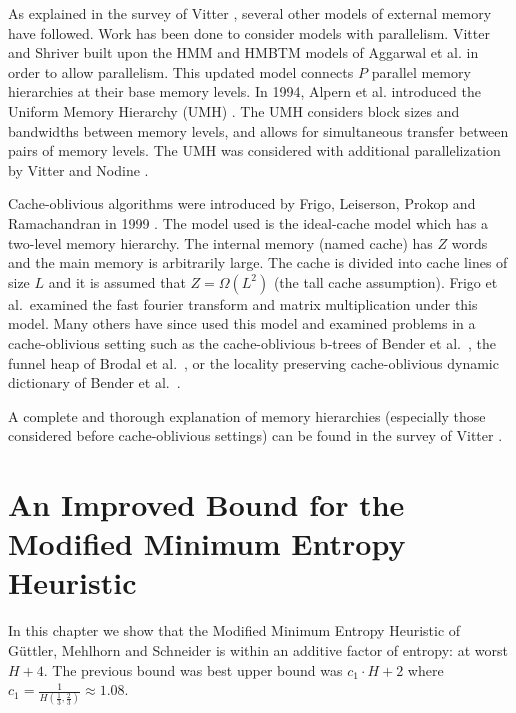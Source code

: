 \documentclass[letterpaper,12pt,titlepage,oneside,final]{book}
\theoremstyle{plain}
\begin{document}
As explained in the survey of Vitter \cite{vitter2001external}, several other models of external memory have followed. Work has been done to consider models with parallelism. Vitter and Shriver \cite{vitter1994algorithms} built upon the HMM and HMBTM models of Aggarwal et al. \cite{aggarwal1987model, aggarwal1987hierarchical} in order to allow parallelism. This updated model connects $P$ parallel memory hierarchies at their base memory levels. In 1994, Alpern et al. introduced the Uniform Memory Hierarchy (UMH) \cite{alpern1994uniform}. The UMH considers block sizes and bandwidths between memory levels, and allows for simultaneous transfer between pairs of memory levels. The UMH was considered with additional parallelization by Vitter and Nodine \cite{vitter1993large}.


Cache-oblivious algorithms were introduced by Frigo, Leiserson, Prokop and Ramachandran in 1999 \cite{frigo1999cache}. The model used is the ideal-cache model which has a two-level memory hierarchy. The internal memory (named cache) has $Z$ words and the main memory is arbitrarily large. The cache is divided into cache lines of size $L$ and it is assumed that $Z=\Omega(L^2)$ (the tall cache assumption). Frigo et al.~examined the fast fourier transform and matrix multiplication under this model. Many others have since used this model and examined problems in a cache-oblivious setting such as the cache-oblivious b-trees of Bender et al.~\cite{bender2000cache}, the funnel heap of Brodal et al.~\cite{brodai2002funnel}, or the locality preserving cache-oblivious dynamic dictionary of Bender et al.~\cite{bender2002locality}.

A complete and thorough explanation of memory hierarchies (especially those considered before cache-oblivious settings) can be found in the survey of Vitter \cite{vitter2001external}.



\chapter{An Improved Bound for the Modified Minimum Entropy Heuristic}\label{An Improved Bound for the Modified Minimum Entropy Heuristic}

In this chapter we show that the Modified Minimum Entropy Heuristic of G{\"u}ttler, Mehlhorn and Schneider \cite{guttler1980binary} is within an additive factor of entropy: at worst $H+4$. The previous bound was best upper bound was $c_1\cdot H+2$ where $c_1=\frac{1}{H(\frac{1}{3}, \frac{2}{3})} \approx 1.08$.
\end{document}
